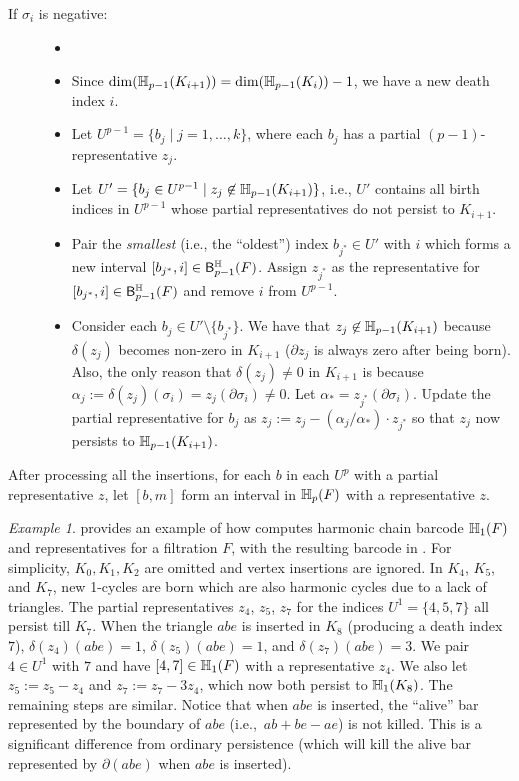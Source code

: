 \documentclass[10pt,a4paper]{amsart}
\newcommand {\mm}[1] {\ifmmode{#1}\else{\mbox{\(#1\)}}\fi}
\newcommand{\har}           {\mm{\mathbb{H}}}
\newcommand{\hcb}{{harmonic chain barcode}}
\theoremstyle{definition}
\newcommand{\filt}{F}
\newcommand{\filtcnt}{m}
\newcommand{\fsimp}{\sigma}
\newcommand{\hbarc}{\mathsf{B}^\har}
\newcommand{\aG}{\alpha}
\newcommand{\sG}{\sigma}
\newcommand{\dG}{\delta}
\theoremstyle{remark}
\newtheorem*{example*}{Example}
\begin{document}
\begin{algrl}
\begin{description}
    \item[If $\sG_i$ is negative:] 
        \begin{itemize}
        \item[]
        \item Since $\dim(\har_{p-1}(K_{i+1}))=\dim(\har_{p-1}(K_{i}))-1$, we have a new death index $i$.
        \item Let $U^{p-1}=\{b_j\mid j=1,\ldots,k\}$, where each $b_j$ has a partial $(p-1)$-representative $z_j$.
        \item Let $U'=\{b_j\in U^{p-1}\mid z_j\not\in\har_{p-1}(K_{i+1})\}$, i.e., $U'$ contains all  birth indices in $U^{p-1}$ whose partial representatives do not persist to $K_{i+1}$.
        \item Pair the \emph{smallest} (i.e., the ``oldest'') index $b_{j^*}\in U'$ with $i$ which forms a new interval $[b_{j^*},i]\in\hbarc_{p-1}(\filt)$. Assign $z_{j^*}$ as the representative for $[b_{j^*},i]\in\hbarc_{p-1}(\filt)$ and remove $i$ from $U^{p-1}$.
        \item Consider each $b_{j}\in U'\setminus\{b_{j^*}\}$. We have that $z_j\not\in\har_{p-1}(K_{i+1})$ because $\dG(z_j)$ becomes non-zero in $K_{i+1}$ ($\partial z_j$ is always zero after being born). Also, the only reason that  $\dG(z_j)\neq 0$ in $K_{i+1}$ is because  $\aG_j:=\dG(z_j)(\fsimp_i)=z_j(\partial\fsimp_i)\neq 0$. Let $\aG_*=z_{j^*}(\partial\fsimp_i)$. Update the partial representative for $b_j$ as $z_j:= z_j-(\aG_j/\aG_*)\cdot z_{j^*}$ so that $z_j$ now persists to $\har_{p-1}(K_{i+1})$.
\end{itemize}
\end{description}

After processing all the insertions, for each $b$ in each $U^p$ with a partial representative $z$, let $[b,\filtcnt]$ form an interval in $\har_p(\filt)$ with a representative $z$.
\end{algrl}

\begin{example*}
 provides an example of how  computes {\hcb} $\har_1(\filt)$ and representatives for a filtration $\filt$, with the resulting barcode  in . For simplicity, $K_0, K_1, K_2$ are omitted and vertex insertions are ignored. 
In $K_4$, $K_5$, and $K_7$, new 1-cycles are born which are also harmonic cycles due to a lack of triangles. The partial representatives $z_4$, $z_5$, $z_7$ for the indices $U^1=\{4,5,7\}$ all persist till $K_7$. 
When the triangle $abe$ is inserted in $K_8$ (producing a death index $7$), $\dG(z_4)(abe)=1$, $\dG(z_5)(abe)=1$, and $\dG(z_7)(abe)=3$.
We pair $4\in U^1$ with $7$ and have $[4,7]\in\har_1(\filt)$ with a representative $z_4$.
We also let $z_5:=z_5-z_4$ and $z_7:=z_7-3z_4$, which now both persist to $\har_1(K_8)$.
The remaining steps are similar. Notice that when $abe$ is inserted, the ``alive'' bar represented by the boundary of $abe$ (i.e.,~$ab+be-ae$) is not killed.
This is a significant difference from ordinary persistence (which will kill the alive bar represented by $\partial(abe)$ when $abe$ is inserted).
\end{example*}
\end{document}
